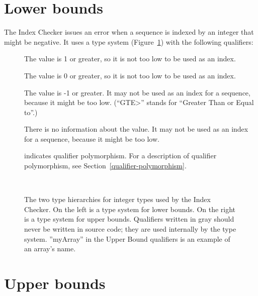 \section{Lower bounds\label{index-lowerbound}}

The Index Checker issues an error when
a sequence is indexed by an integer that might be negative.
It uses a type system (Figure~\ref{fig-index-int-types}) with the following
qualifiers:

\begin{description}
\item[]
  The value is 1 or greater, so it is not too low to be used as an index.
\item[]
  The value is 0 or greater, so it is not too low to be used as an index.
\item[]
  The value is -1 or greater.
  It may not be used as an index for a sequence, because it might be too low.
  (``\<GTE>'' stands for ``Greater Than or Equal to''.)
\item[]
  There is no information about the value.
  It may not be used as an index for a sequence, because it might be too low.
\item[]
  indicates qualifier polymorphism.
  For a description of qualifier polymorphism, see
  Section~\ref{qualifier-polymorphism}.
\end{description}

\begin{figure}
\begin{center}
  \hfill
  ~~~~\hfill~~~~
  \hfill
\end{center}
  \caption{The two type hierarchies for integer types used by the Index
    Checker.  On the left is a type system for lower bounds.  On the right
    is a type system for upper bounds.  Qualifiers written in gray should
    never be written in source code; they are used internally by the type
    system. ''myArray'' in the Upper Bound qualifiers is an example of
    an array's name.}
  \label{fig-index-int-types}
\end{figure}


\section{Upper bounds\label{index-upperbound}}

